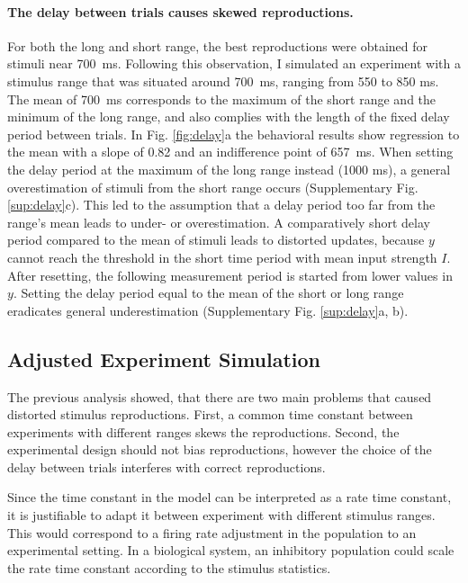 \documentclass[10pt]{article}
\begin{document}
\paragraph{The delay between trials causes skewed reproductions.}
For both the long and short range, the best reproductions were obtained for stimuli near 700~ms.
Following this observation, I simulated an experiment with a stimulus range that was situated around 700~ms, ranging from 550 to 850 ms. 
The mean of 700~ms corresponds to the maximum of the short range and the minimum of the long range, and also complies with the length of the fixed delay period between trials.
In Fig. \ref{fig:delay}a the behavioral results show regression to the mean with a slope of 0.82 and an indifference point of 657~ms.
When setting the delay period at the maximum of the long range instead (1000 ms), a general overestimation of stimuli from the short range occurs (Supplementary Fig. \ref{sup:delay}c).
This led to the assumption that a delay period too far from the range's mean leads to under- or overestimation. 
A comparatively short delay period compared to the mean of stimuli leads to distorted updates, because $y$ cannot reach the threshold in the short time period with mean input strength $I$. 
After resetting, the following measurement period is started from lower values in $y$. 
Setting the delay period equal to the mean of the short or long range 
eradicates general underestimation (Supplementary Fig. \ref{sup:delay}a, b).

\subsection{Adjusted Experiment Simulation}
The previous analysis showed, that there are two main problems that caused distorted stimulus reproductions. 
First, a common time constant between experiments with different ranges skews the reproductions.
Second, the experimental design should not bias reproductions, however the choice of the delay between trials interferes with correct reproductions. %

Since the time constant in the model can be interpreted as a rate time constant, it is justifiable to adapt it between experiment with different stimulus ranges. 
This would correspond to a firing rate adjustment in the population to an experimental setting.
In a biological system, an inhibitory population could scale the rate time constant according to the stimulus statistics.
\end{document}
